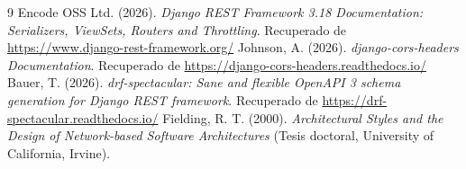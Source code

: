 \documentclass[10pt,a4paper]{article}
\begin{document}
\begin{thebibliography}{9}
    Encode OSS Ltd. (2026). \textit{Django REST Framework 3.18 Documentation: Serializers, ViewSets, Routers and Throttling}. Recuperado de \url{https://www.django-rest-framework.org/}
    Johnson, A. (2026). \textit{django-cors-headers Documentation}. Recuperado de \url{https://django-cors-headers.readthedocs.io/}
    Bauer, T. (2026). \textit{drf-spectacular: Sane and flexible OpenAPI 3 schema generation for Django REST framework}. Recuperado de \url{https://drf-spectacular.readthedocs.io/}
    Fielding, R. T. (2000). \textit{Architectural Styles and the Design of Network-based Software Architectures} (Tesis doctoral, University of California, Irvine).
\end{thebibliography}
\end{document}
